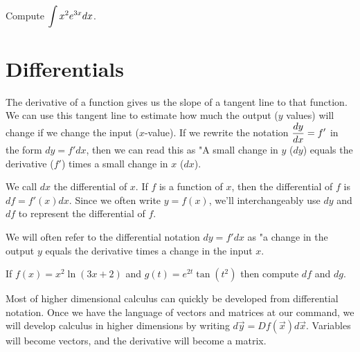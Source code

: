 \begin{problem}
Compute $\displaystyle \int x^2 e^{3x} dx$.
\end{problem}



\section{Differentials}
The derivative of a function gives us the slope of a tangent line to that function. We can use this tangent line to estimate how much the output ($y$ values) will change if we change the input ($x$-value). If we rewrite the notation $\displaystyle\frac{dy}{dx}=f'$ in the form $dy=f' dx$, then we can read this as "A small change in $y$ ($dy$) equals the derivative ($f'$) times a small change in $x$ ($dx$). 

\begin{definition}
We call $dx$ the differential of $x$.  If $f$ is a function of $x$, then the differential of $f$ is $df = f'(x) dx$. Since we often write $y=f(x)$, we'll interchangeably use $dy$ and $df$ to represent the differential of $f$. 

We will often refer to the differential notation $dy=f'dx$ as "a change in the output $y$ equals the derivative times a change in the input $x$. 
\end{definition}

\begin{problem}
If $f(x) = x^2\ln(3x+2)$ and $g(t) = e^{2t}\tan(t^2)$ then compute $df$ and $dg$.  
\end{problem}

Most of higher dimensional calculus can quickly be developed from differential notation. Once we have the language of vectors and matrices at our command, we will develop calculus in higher dimensions by writing $d\vec y = Df(\vec x) d\vec x$.  Variables will become vectors, and the derivative will become a matrix.
 

